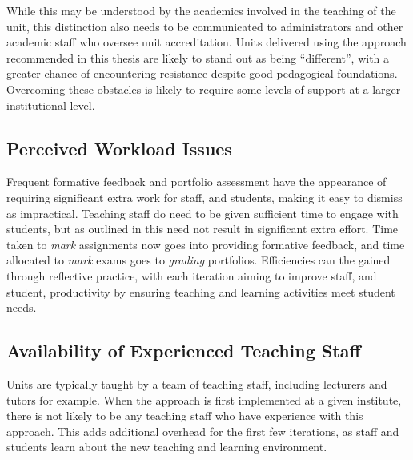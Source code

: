 While this may be understood by the academics involved in the teaching of the unit, this distinction also needs to be communicated to administrators and other academic staff who oversee unit accreditation. Units delivered using the approach recommended in this thesis are likely to stand out as being ``different'', with a greater chance of encountering resistance despite good pedagogical foundations. Overcoming these obstacles is likely to require some levels of support at a larger institutional level. 


\subsection{Perceived Workload Issues} %
\label{sub:perceived_workload_issues}

Frequent formative feedback and portfolio assessment have the appearance of requiring significant extra work for staff, and students, making it easy to dismiss as impractical. Teaching staff do need to be given sufficient time to engage with students, but as outlined in  this need not result in significant extra effort. Time taken to \emph{mark} assignments now goes into providing formative feedback, and time allocated to \emph{mark} exams goes to \emph{grading} portfolios. Efficiencies can the gained through reflective practice, with each iteration aiming to improve staff, and student, productivity by ensuring teaching and learning activities meet student needs.


\subsection{Availability of Experienced Teaching Staff} %
\label{sub:availability_of_teaching_staff}

Units are typically taught by a team of teaching staff, including lecturers and tutors for example. When the approach is first implemented at a given institute, there is not likely to be any teaching staff who have experience with this approach. This adds additional overhead for the first few iterations, as staff and students learn about the new teaching and learning environment.




